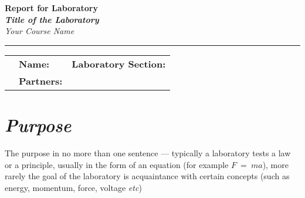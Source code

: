 \documentclass[epsfig,12pt]{article}
\begin{document}
\begin{center}
	\textbf{ \huge \color{RoyalBlue} Report for Laboratory \underline{\hskip 1cm}  }\\[2mm]
	\textbf{\textit{ \Large \color{VioletRed} Title of the Laboratory  }}\\[2mm]
	\textit{ \large \color{BlueViolet} Your Course Name  }
\end{center}
\hrule
\bigskip
\begin{tabularx}{\textwidth}{lXr}
%
	&
	\textbf{Name:}
	&
	\textbf{Laboratory Section:}
	\hspace{1.0cm}
	\\[2mm]
%
	&
	\textbf{Partners:}
\end{tabularx}
\medskip


\section*{\textit{Purpose}}

	The purpose in no more than one sentence --- typically a laboratory tests a law or a principle,
	usually in the form of an equation (for example $ F ~=~ m a $),
	more rarely the goal of the laboratory is acquaintance with 
	certain concepts (such as energy, momentum, force, voltage \emph{etc})


\end{document}
